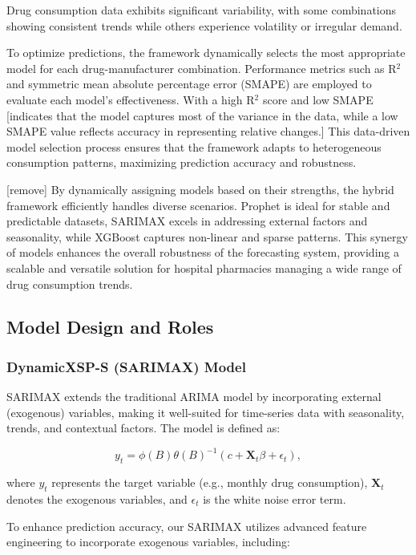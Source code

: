 \documentclass[journal]{IEEEtran}
\begin{document}
Drug consumption data exhibits significant variability, with some combinations showing consistent trends while others experience volatility or irregular demand. 

To optimize predictions, the framework dynamically selects the most appropriate model for each drug-manufacturer combination. Performance metrics such as R\(^2\) and symmetric mean absolute percentage error (SMAPE) are employed to evaluate each model’s effectiveness. With a high R\(^2\) score and low SMAPE [indicates that the model captures most of the variance in the data, while a low SMAPE value reflects accuracy in representing relative changes.] This data-driven model selection process ensures that the framework adapts to heterogeneous consumption patterns, maximizing prediction accuracy and robustness.

[remove] By dynamically assigning models based on their strengths, the hybrid framework efficiently handles diverse scenarios. Prophet is ideal for stable and predictable datasets, SARIMAX excels in addressing external factors and seasonality, while XGBoost captures non-linear and sparse patterns. This synergy of models enhances the overall robustness of the forecasting system, providing a scalable and versatile solution for hospital pharmacies managing a wide range of drug consumption trends.

\subsection{Model Design and Roles}
\subsubsection{DynamicXSP-S (SARIMAX) Model}

SARIMAX extends the traditional ARIMA model by incorporating external (exogenous) variables, making it well-suited for time-series data with seasonality, trends, and contextual factors. The model is defined as:

\begin{equation}
y_{t} = \phi(B)\theta(B)^{-1} \left( c + \mathbf{X}_{t}\beta + \epsilon_{t} \right),
\end{equation}

where \(y_{t}\) represents the target variable (e.g., monthly drug consumption), \(\mathbf{X}_{t}\) denotes the exogenous variables, and \(\epsilon_{t}\) is the white noise error term. 

To enhance prediction accuracy, our SARIMAX utilizes advanced feature engineering to incorporate exogenous variables, including:
\end{document}
